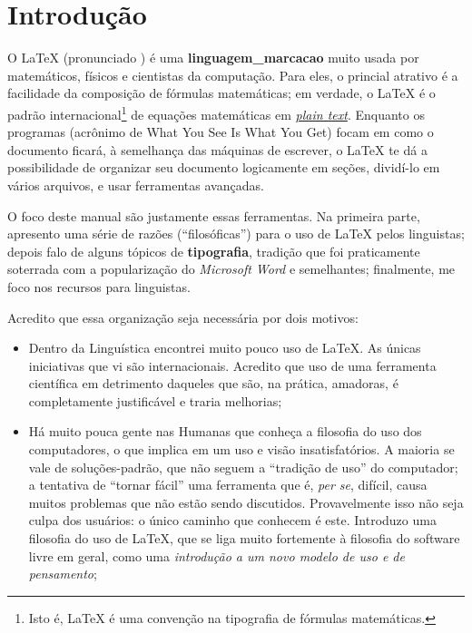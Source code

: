 \chapter{Introdução}

O \LaTeX{} (pronunciado ) é uma \textbf{\gls{linguagem_marcacao}} muito usada por matemáticos, físicos e cientistas da computação. Para eles, o princial atrativo é a facilidade da composição de fórmulas matemáticas; em verdade, o \LaTeX{} é o padrão internacional\footnote{Isto é, \LaTeX{} é uma convenção na tipografia de fórmulas matemáticas.} de equações matemáticas em \href{http://en.wikipedia.org/wiki/Plain_text}{\emph{plain text}}. Enquanto os programas \href{http://en.wikipedia.org/wiki/WYSIWYG}{} (acrônimo de What You See Is What You Get) focam em como o documento ficará, à semelhança das máquinas de escrever, o \LaTeX{} te dá a possibilidade de organizar seu documento logicamente em seções, dividí-lo em vários arquivos, e usar ferramentas avançadas.

O foco deste manual são justamente essas ferramentas. Na primeira parte, apresento uma série de razões (``filosóficas'') para o uso de \LaTeX{} pelos linguistas; depois falo de alguns tópicos de \textbf{tipografia}, tradição que foi praticamente soterrada com a popularização do \emph{Microsoft Word} e semelhantes; finalmente, me foco nos recursos para linguistas.

Acredito que essa organização seja necessária por dois motivos:

\begin{itemize}
	\item Dentro da Linguística encontrei muito pouco uso de \LaTeX. As únicas iniciativas que vi são internacionais. Acredito que uso de uma ferramenta científica em detrimento daqueles que são, na prática, amadoras, é completamente justificável e traria melhorias;
	\item Há muito pouca gente nas Humanas que conheça a filosofia do uso dos computadores, o que implica em um uso e visão insatisfatórios. A maioria se vale de soluções-padrão, que não seguem a ``tradição de uso'' do computador; a tentativa de ``tornar fácil'' uma ferramenta que é, \emph{per se}, difícil, causa muitos problemas que não estão sendo discutidos. Provavelmente isso não seja culpa dos usuários: o único caminho que conhecem é este. Introduzo uma filosofia do uso de \LaTeX{}, que se liga muito fortemente à filosofia do software livre em geral, como uma \emph{introdução a um novo modelo de uso e de pensamento};
\end{itemize}

